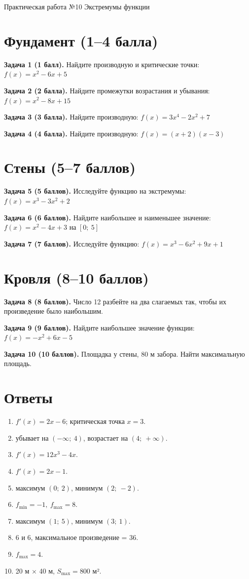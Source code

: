 \documentclass{umk-matematika}
\begin{document}
\maketitlepage
    {Практическая работа №10}
    {Экстремумы функции}
    {}

\section{Фундамент (1--4 балла)}

\textbf{Задача 1 (1 балл).} Найдите производную и критические точки: $f(x) = x^2 - 6x + 5$

\textbf{Задача 2 (2 балла).} Найдите промежутки возрастания и убывания: $f(x) = x^2 - 8x + 15$

\textbf{Задача 3 (3 балла).} Найдите производную: $f(x) = 3x^4 - 2x^2 + 7$

\textbf{Задача 4 (4 балла).} Найдите производную: $f(x) = (x + 2)(x - 3)$

\section{Стены (5--7 баллов)}

\textbf{Задача 5 (5 баллов).} Исследуйте функцию на экстремумы: $f(x) = x^3 - 3x^2 + 2$

\textbf{Задача 6 (6 баллов).} Найдите наибольшее и наименьшее значение: $f(x) = x^2 - 4x + 3$ на $[0;\ 5]$

\textbf{Задача 7 (7 баллов).} Исследуйте функцию: $f(x) = x^3 - 6x^2 + 9x + 1$

\section{Кровля (8--10 баллов)}

\textbf{Задача 8 (8 баллов).} Число 12 разбейте на два слагаемых так, чтобы их произведение было наибольшим.

\textbf{Задача 9 (9 баллов).} Найдите наибольшее значение функции: $f(x) = -x^2 + 6x - 5$

\textbf{Задача 10 (10 баллов).} Площадка у стены, 80 м забора. Найти максимальную площадь.

\newpage
\section*{Ответы}

\begin{enumerate}
  \item $f'(x) = 2x - 6$; критическая точка $x = 3$.
  \item убывает на $(-\infty;\ 4)$, возрастает на $(4;\ +\infty)$.
  \item $f'(x) = 12x^3 - 4x$.
  \item $f'(x) = 2x - 1$.
  \item максимум $(0;\ 2)$, минимум $(2;\ -2)$.
  \item $f_{\min} = -1,\ f_{\max} = 8$.
  \item максимум $(1;\ 5)$, минимум $(3;\ 1)$.
  \item 6 и 6, максимальное произведение = 36.
  \item $f_{\max} = 4$.
  \item 20 м × 40 м, $S_{\max} = 800$ м².
\end{enumerate}
\end{document}
